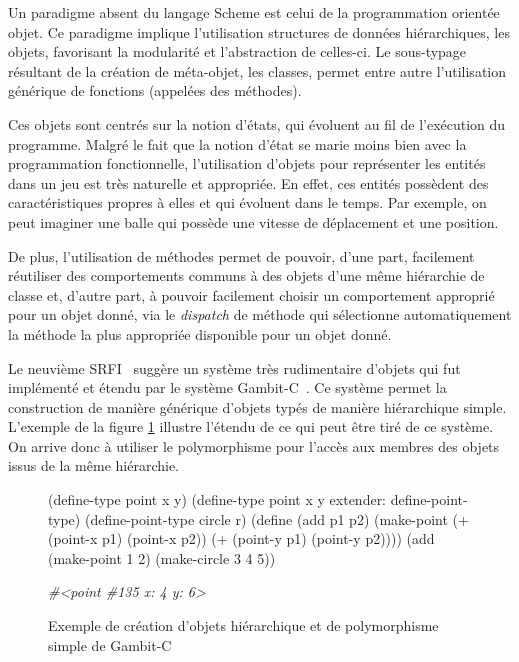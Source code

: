 \documentclass[12pt,oneside,letterpaper,francais]{book}
\newcommand{\schemeresult}[1]{{\it #1}}
\begin{document}
Un paradigme absent du langage Scheme est celui de la programmation
orientée objet. Ce paradigme implique l'utilisation structures de
données hiérarchiques, les objets, favorisant la modularité et
l'abstraction de celles-ci. Le sous-typage résultant de la création de
méta-objet, les classes, permet entre autre l'utilisation générique de
fonctions (appelées des méthodes). 

Ces objets sont centrés sur la notion d'états, qui évoluent au fil de
l'exécution du programme. Malgré le fait que la notion d'état se marie
moins bien avec la programmation fonctionnelle, l'utilisation d'objets
pour représenter les entités dans un jeu est très naturelle et
appropriée. En effet, ces entités possèdent des caractéristiques
propres à elles et qui évoluent dans le temps. Par exemple, on peut
imaginer une balle qui possède une vitesse de déplacement et une
position. 

De plus, l'utilisation de méthodes permet de pouvoir, d'une part,
facilement réutiliser des comportements communs à des objets d'une
même hiérarchie de classe et, d'autre part, à pouvoir facilement
choisir un comportement approprié pour un objet donné, via le
\textit{dispatch} de méthode qui sélectionne automatiquement la
méthode la plus appropriée disponible pour un objet donné.

Le neuvième SRFI~\cite{SRFI_9} suggère un système très rudimentaire
d'objets qui fut implémenté et étendu par le système
Gambit-C~\cite{Gambit4}. Ce système permet la construction de manière
générique d'objets typés de manière hiérarchique simple. L'exemple de
la figure \ref{OO:gambit-obj} illustre l'étendu de ce qui peut être
tiré de ce système. On arrive donc à utiliser le polymorphisme pour
l'accès aux membres des objets issus de la même hiérarchie.

\begin{figure}[htb!]
  \begin{schemecode}
(define-type point x y)
(define-type point x y extender: define-point-type)
(define-point-type circle r)
(define (add p1 p2) (make-point (+ (point-x p1) (point-x p2))
                                (+ (point-y p1) (point-y p2))))
(add (make-point 1 2) (make-circle 3 4 5))
  \end{schemecode}
  \schemeresult{\#\textless point \#135 x: 4 y: 6\textgreater}
  \caption{Exemple de création d'objets hiérarchique et de
    polymorphisme simple de Gambit-C}
  \label{OO:gambit-obj}
\end{figure}
\end{document}
